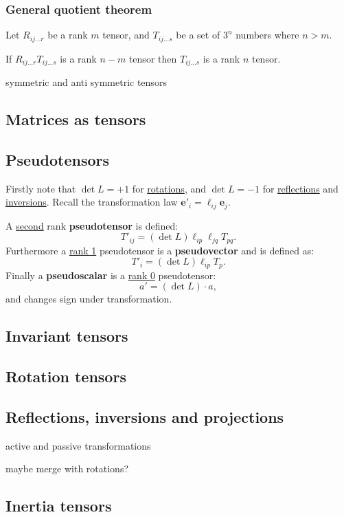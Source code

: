 \documentclass{article}
\begin{document}
\subsubsection{General quotient theorem}
Let $R_{ij\dots r}$ be a rank $m$ tensor, and $T_{ij\dots s}$ be a set of $3^n$ numbers where $n>m$.

If $R_{ij\dots r}T_{ij\dots s}$ is a rank $n-m$ tensor then $T_{ij\dots s}$ is a rank $n$ tensor.

symmetric and anti symmetric tensors

\subsection{Matrices as tensors}

\subsection{Pseudotensors}
Firstly note that $\det L=+1$ for \underline{rotations}, and $\det L=-1$ for \underline{reflections} and \underline{inversions}. Recall the transformation law $\boldsymbol{e}'_i=\ell_{ij}\boldsymbol{e}_j$.

A \underline{second} rank \textbf{pseudotensor} is defined:
$$T'_{ij}=(\det L)\ell_{ip}\ell_{jq}T_{pq}.$$
Furthermore a \underline{rank 1} pseudotensor is a \textbf{pseudovector} and is defined as:
$$T'_{i}=(\det L)\ell_{ip}T_{p}.$$
Finally a \textbf{pseudoscalar} is a \underline{rank 0} pseudotensor:
$$a'=(\det L)\cdot a,$$
and changes sign under transformation.

\subsection{Invariant tensors}

\subsection{Rotation tensors}

\subsection{Reflections, inversions and projections}
active and passive transformations

maybe merge with rotations?

\subsection{Inertia tensors}
\end{document}
